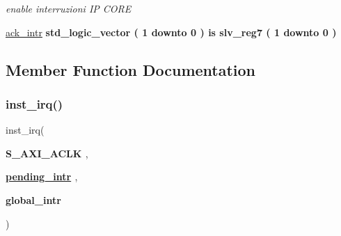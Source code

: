 \begin{DoxyCompactItemize}
\begin{DoxyCompactList}\small\item\em enable interruzioni IP C\+O\+RE \end{DoxyCompactList}\item 
\hyperlink{classUART__v1__0__S00__AXI_1_1arch__imp_a65e0e54a6d565935dd24ce96dbbce53a}{ack\+\_\+intr}  {\bfseries {\bfseries \textcolor{vhdlchar}{std\+\_\+logic\+\_\+vector}\textcolor{vhdlchar}{ }\textcolor{vhdlchar}{(}\textcolor{vhdlchar}{ }\textcolor{vhdlchar}{ } \textcolor{vhdldigit}{1} \textcolor{vhdlchar}{ }\textcolor{vhdlchar}{downto}\textcolor{vhdlchar}{ }\textcolor{vhdlchar}{ } \textcolor{vhdldigit}{0} \textcolor{vhdlchar}{ }\textcolor{vhdlchar}{)}\textcolor{vhdlchar}{ }\textcolor{vhdlchar}{ }\textcolor{vhdlchar}{ }\textcolor{vhdlchar}{ }\textcolor{vhdlchar}{is}\textcolor{vhdlchar}{ }\textcolor{vhdlchar}{slv\+\_\+reg7}\textcolor{vhdlchar}{ }\textcolor{vhdlchar}{(}\textcolor{vhdlchar}{ }\textcolor{vhdlchar}{ } \textcolor{vhdldigit}{1} \textcolor{vhdlchar}{ }\textcolor{vhdlchar}{downto}\textcolor{vhdlchar}{ }\textcolor{vhdlchar}{ } \textcolor{vhdldigit}{0} \textcolor{vhdlchar}{ }\textcolor{vhdlchar}{)}\textcolor{vhdlchar}{ }}} {\bfseries \textcolor{vhdlchar}{ }} 
\end{DoxyCompactItemize}


\subsection{Member Function Documentation}
\mbox{\label{classUART__v1__0__S00__AXI_1_1arch__imp_ad49f0dfc577739899b90a7243c22a1cd}} 
\subsubsection{\texorpdfstring{inst\+\_\+irq()}{inst\_irq()}}
{\footnotesize\ttfamily  {\bfseries \textcolor{vhdlchar}{ }} inst\+\_\+irq(\begin{DoxyParamCaption}\item[{}]{{\bfseries \textcolor{vhdlchar}{S\+\_\+\+A\+X\+I\+\_\+\+A\+C\+LK}\textcolor{vhdlchar}{ }} {\em } ,  }\item[{}]{{\bfseries {\bfseries \hyperlink{classUART__v1__0__S00__AXI_1_1arch__imp_a5595ca2e548ef1d12b7fa2bac3e2aa00}{pending\+\_\+intr}} \textcolor{vhdlchar}{ }} {\em } ,  }\item[{}]{{\bfseries \textcolor{vhdlchar}{global\+\_\+intr}\textcolor{vhdlchar}{ }} {\em } }\end{DoxyParamCaption})\hspace{0.3cm}{\ttfamily [Process]}}



